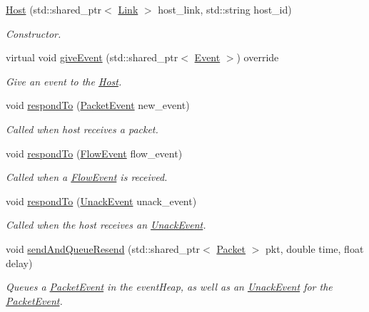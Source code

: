 \begin{DoxyCompactItemize}
\item 
\hyperlink{classHost_afde96dd6239594d91697006a850bea5b}{\-Host} (std\-::shared\-\_\-ptr$<$ \hyperlink{classLink}{\-Link} $>$ host\-\_\-link, std\-::string host\-\_\-id)
\begin{DoxyCompactList}\small\item\em \-Constructor. \end{DoxyCompactList}\item 
virtual void \hyperlink{classHost_a658a8bee30dfb9e6ff7abc26620f88ff}{give\-Event} (std\-::shared\-\_\-ptr$<$ \hyperlink{classEvent}{\-Event} $>$) override
\begin{DoxyCompactList}\small\item\em \-Give an event to the \hyperlink{classHost}{\-Host}. \end{DoxyCompactList}\item 
void \hyperlink{classHost_a1386df4e48df0cf8e7252c55fa9e0f2b}{respond\-To} (\hyperlink{classPacketEvent}{\-Packet\-Event} new\-\_\-event)
\begin{DoxyCompactList}\small\item\em \-Called when host receives a packet. \end{DoxyCompactList}\item 
void \hyperlink{classHost_a15013b657e880635a087ce41d9bccaf8}{respond\-To} (\hyperlink{classFlowEvent}{\-Flow\-Event} flow\-\_\-event)
\begin{DoxyCompactList}\small\item\em \-Called when a \hyperlink{classFlowEvent}{\-Flow\-Event} is received. \end{DoxyCompactList}\item 
void \hyperlink{classHost_af19765406b0fc694ec4122ef57d3bbb3}{respond\-To} (\hyperlink{classUnackEvent}{\-Unack\-Event} unack\-\_\-event)
\begin{DoxyCompactList}\small\item\em \-Called when the host receives an \hyperlink{classUnackEvent}{\-Unack\-Event}. \end{DoxyCompactList}\item 
void \hyperlink{classHost_a029c7f389a580fc7e53da38a698d0d9a}{send\-And\-Queue\-Resend} (std\-::shared\-\_\-ptr$<$ \hyperlink{classPacket}{\-Packet} $>$ pkt, double time, float delay)
\begin{DoxyCompactList}\small\item\em \-Queues a \hyperlink{classPacketEvent}{\-Packet\-Event} in the event\-Heap, as well as an \hyperlink{classUnackEvent}{\-Unack\-Event} for the \hyperlink{classPacketEvent}{\-Packet\-Event}. \end{DoxyCompactList}\item 

\end{DoxyCompactItemize}
